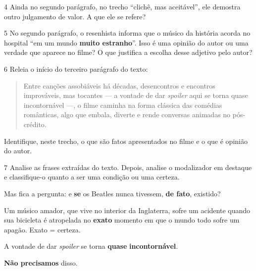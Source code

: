 
\num{4} Ainda no segundo parágrafo, no trecho ``clichê, mas aceitável'',
ele demostra outro julgamento de valor. A que ele se refere?


\num{5} No segundo parágrafo, o resenhista informa que o músico da
história acorda no hospital ``em um mundo \textbf{muito estranho}''.
Isso é uma opinião do autor ou uma verdade que aparece no filme? O que
justifica a escolha desse adjetivo pelo autor?


\num{6} Releia o início do terceiro parágrafo do texto:

\begin{quote}
Entre canções assobiáveis há décadas, desencontros e encontros
improváveis, mas tocantes — a vontade de dar \emph{spoiler} aqui se
torna quase incontornável —, o filme caminha na forma clássica das
comédias românticas, algo que embala, diverte e rende conversas animadas
no pós-crédito.
\end{quote}

\noindent Identifique, neste trecho, o que são fatos apresentados no filme e o que
é opinião do autor.


\num{7} Analise as frases extraídas do texto. Depois, analise o
modalizador em destaque e classifique-o quanto a ser uma condição ou uma
certeza.

\begin{escolha}
\item Mas fica a pergunta: e \textbf{{se}} os Beatles nunca tivessem,
\textbf{{de fato}}, existido? 
\item Um músico amador, que vive no interior da Inglaterra, sofre um
acidente quando sua bicicleta é atropelada no \textbf{{exato}} momento
em que o mundo todo sofre um apagão. {Exato = certeza.\hfill}
\item A vontade de dar \emph{spoiler} se torna \textbf{{quase}}
\textbf{{incontornável}}. 
\item \textbf{{Não precisamos}} disso. 
\end{escolha}

